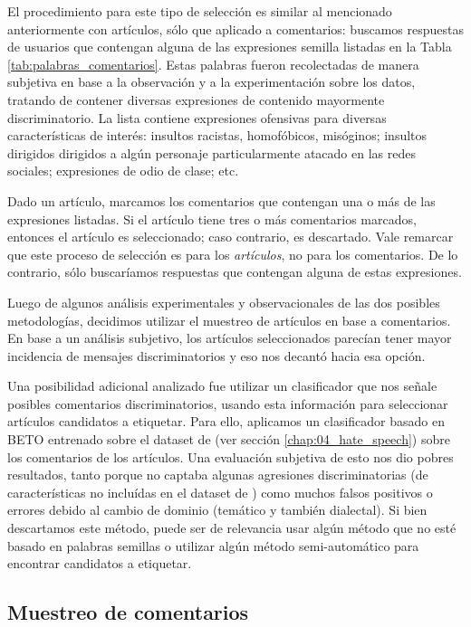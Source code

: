 El procedimiento para este tipo de selección es similar al mencionado anteriormente con artículos, sólo que aplicado a comentarios: buscamos respuestas de usuarios que contengan alguna de las expresiones semilla listadas en la Tabla \ref{tab:palabras_comentarios}. Estas palabras fueron recolectadas de manera subjetiva en base a la observación y a la experimentación sobre los datos, tratando de contener diversas expresiones de contenido mayormente discriminatorio. La lista contiene expresiones ofensivas para diversas características de interés: insultos racistas, homofóbicos, misóginos; insultos dirigidos dirigidos a algún personaje particularmente atacado en las redes sociales; expresiones de odio de clase; etc.

Dado un artículo, marcamos los comentarios que contengan una o más de las expresiones listadas. Si el artículo tiene tres o más comentarios marcados, entonces el artículo es seleccionado; caso contrario, es descartado. Vale remarcar que este proceso de selección es para los \emph{artículos}, no para los comentarios. De lo contrario, sólo buscaríamos respuestas que contengan alguna de estas expresiones.

Luego de algunos análisis experimentales y observacionales de las dos posibles metodologías, decidimos utilizar el muestreo de artículos en base a comentarios. En base a un análisis subjetivo, los artículos seleccionados parecían tener mayor incidencia de mensajes discriminatorios y eso nos decantó hacia esa opción.

Una posibilidad adicional analizado fue utilizar un clasificador que nos señale posibles comentarios discriminatorios, usando esta información para seleccionar artículos candidatos a etiquetar. Para ello, aplicamos un clasificador basado en BETO \cite{canete2020spanish} entrenado sobre el dataset de \hateval{} (ver sección \ref{chap:04_hate_speech}) sobre los comentarios de los artículos. Una evaluación subjetiva de esto nos dio pobres resultados, tanto porque no captaba algunas agresiones discriminatorias (de características no incluídas en el dataset de \citet{hateval2019semeval}) como muchos falsos positivos o errores debido al cambio de dominio (temático y también dialectal). Si bien descartamos este método, puede ser de relevancia usar algún método que no esté basado en palabras semillas o utilizar algún método semi-automático para encontrar candidatos a etiquetar.


\subsection{Muestreo de comentarios}

